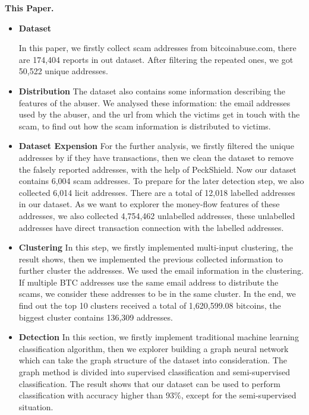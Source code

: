 \textbf{This Paper.}
\begin{itemize}
    \item \textbf{Dataset} 
    
    In this paper, we firstly collect scam addresses from bitcoinabuse.com\cite{bitcoinabuse}, there are 174,404 reports in out dataset. After filtering the repeated ones, we got 50,522 unique addresses.
    \item \textbf{Distribution} 
     The dataset also contains some information describing the features of the abuser. We analysed these information: the email addresses used by the abuser, and the url from which the victims get in touch with the scam, to find out how the scam information is distributed to victims. 
     
     
     \item \textbf{Dataset Expension}
     For the further analysis, we firstly filtered the unique addresses by if they have transactions, then we clean the dataset to remove the falsely reported addresses, with the help of PeckShield. Now our dataset contains 6,004 scam addresses. To prepare for the later detection step, we also collected 6,014 licit addresses. There are a total of 12,018 labelled addresses in our dataset. As we want to explorer the money-flow features of these addresses, we also collected 4,754,462 unlabelled addresses, these unlabelled addresses have direct transaction connection with the labelled addresses. 
     \item \textbf{Clustering}
      In this step, we firstly implemented multi-input clustering, the result shows, then we implemented the previous collected information to further cluster the addresses. We used the email information in the clustering. If multiple BTC addresses use the same email address to distribute the scams, we consider these addresses to be in the same cluster. In the end, we find out the top 10 clusters received a total of 1,620,599.08 bitcoins, the biggest cluster contains 136,309 addresses.
     
     \item \textbf{Detection}
     In this section, we firstly implement traditional machine learning classification algorithm, then we explorer building a graph neural network which can take the graph structure of the dataset into consideration. The graph method is divided into supervised classification and semi-supervised classification. The result shows that our dataset can be used to perform classification with accuracy higher than 93\%, except for the semi-supervised situation.
\end{itemize}





